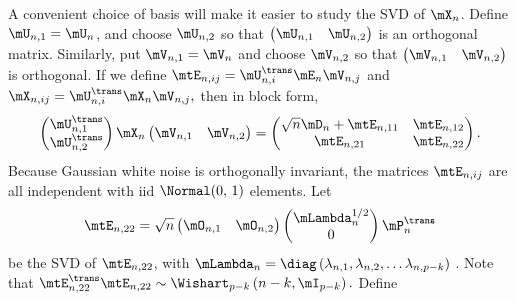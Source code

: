 A convenient choice of basis will make it easier to study the SVD of $\mX_n$.  Define $\mU_{n,1} = \mU_n$, and choose $\mU_{n,2}$ so that
\(
    \left( 
    \begin{matrix}
        \mU_{n,1} & \mU_{n,2}
    \end{matrix}
    \right)
\) 
is an orthogonal matrix. Similarly, put $\mV_{n,1} = \mV_n$ and choose
$\mV_{n,2}$ so that
\(
    \left(
    \begin{matrix}
        \mV_{n,1} & \mV_{n,2}
    \end{matrix}
    \right)
\)
is orthogonal.  If we define
\(
    \mtE_{n,ij} = \mU_{n,i}^\trans \mE_n \mV_{n,j}
\)
and
\(
    \mX_{n,ij} = \mU_{n,i}^\trans \mX_n \mV_{n,j},
\)
then in block form,
\[
    \left( 
    \begin{matrix}
        \mU_{n,1}^\trans \\
        \mU_{n,2}^\trans
    \end{matrix}
    \right)
    \mX_n
    \left(
    \begin{matrix}
        \mV_{n,1} & \mV_{n,2}
    \end{matrix}
    \right)
    =
    \left(
    \begin{matrix}
        \sqrt{n} \mD_n + \mtE_{n,11} & \mtE_{n,12} \\
        \mtE_{n,21}                  & \mtE_{n,22}
    \end{matrix}
    \right).
\]
Because Gaussian white noise is orthogonally invariant, the
matrices $\mtE_{n,ij}$ are all independent with iid $\Normal(0, \, 1)$ elements.  Let
\begin{equation}
    \mtE_{n,22}
    =
    \sqrt{n}
    \left(
    \begin{matrix}
        \mO_{n,1} & \mO_{n,2}
    \end{matrix}
    \right)
    \left(
    \begin{matrix}
        \mLambda_n^{1/2} \\
        0
    \end{matrix}
    \right)
    \mP_{n}^\trans
\end{equation}
be the SVD of $\mtE_{n,22}$, with
\(
    \mLambda_n
    =
    \diag \left(
        \lambda_{n,1}, 
        \lambda_{n,2}, 
        \ldots
        \lambda_{n,p-k}
    \right)
\)
.  Note that 
\(
    \mtE_{n,22}^\trans \mtE_{n,22}
    \sim
    \Wishart_{p-k} \left( n-k, \mI_{p-k} \right).
\)
Define

